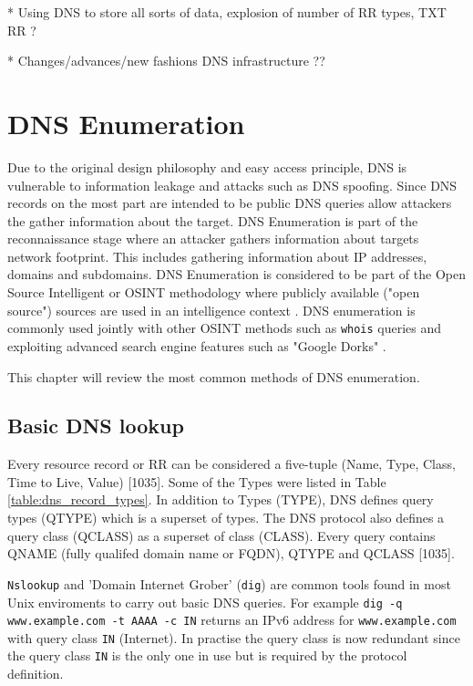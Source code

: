 * Using DNS to store all sorts of data, explosion of number of RR types, TXT RR ?

* Changes/advances/new fashions  DNS infrastructure ??

\section{DNS Enumeration}

Due to the original design philosophy and easy access principle, DNS is vulnerable to information leakage and attacks such as DNS spoofing. Since DNS records on the most part are intended to be public DNS queries allow attackers the gather information about the target. DNS Enumeration is part of the reconnaissance stage where an attacker gathers information about targets network footprint. This includes gathering information about IP addresses, domains and subdomains. DNS Enumeration is considered to be part of the Open Source Intelligent or OSINT methodology where publicly available ("open source") sources are used in an intelligence context \cite{network_sec_assessment}. DNS enumeration is commonly used jointly with other OSINT methods such as \texttt{whois} queries and exploiting advanced search engine features such as "Google Dorks" \cite{network_sec_assessment}.

This chapter will review the most common methods of DNS enumeration.

\subsection{Basic DNS lookup}

Every resource record or RR can be considered a five-tuple (Name, Type, Class, Time to Live, Value) [1035]. Some of the Types were listed in Table \ref{table:dns_record_types}. In addition to Types (TYPE), DNS defines query types (QTYPE) which is a superset of types. The DNS protocol also defines a query class (QCLASS) as a superset of class (CLASS). Every query contains QNAME (fully qualifed domain name or FQDN), QTYPE and QCLASS [1035].

\texttt{Nslookup} and 'Domain Internet Grober' (\texttt{dig}) are common tools found in most Unix enviroments to carry out basic DNS queries. For example \texttt{dig -q www.example.com -t AAAA -c IN} returns an IPv6 address for \texttt{www.example.com} with query class \texttt{IN} (Internet). In practise the query class is now redundant since the query class \texttt{IN} is the only one in use but is required by the protocol definition.

